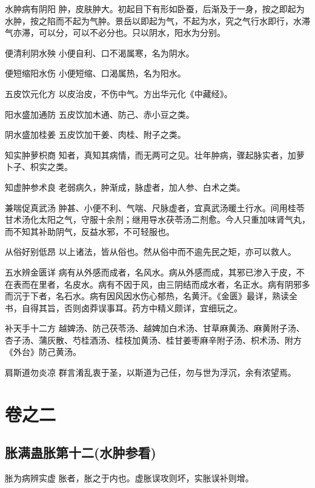 \documentclass[a4paper,12pt,UTF8,twoside]{ctexbook}
\begin{document}
    水肿病有阴阳
    肿，皮肤肿大。初起目下有形如卧蚕，后渐及于一身，按之即起为水肿，按之陷而不起为气肿。景岳以即起为气，不起为水，究之气行水即行，水滞气亦滞，可以分，可以不必分也。只以阴水，阳水为分别。
    
    便清利阴水殃
    小便自利、口不渴属寒，名为阴水。
    
    便短缩阳水伤
    小便短缩、口渴属热，名为阳水。
    
    五皮饮元化方
    以皮治皮，不伤中气。方出华元化《中藏经》。
    
    阳水盛加通防
    五皮饮加木通、防己、赤小豆之类。
    
    阴水盛加桂姜
    五皮饮加干姜、肉桂、附子之类。
    
    知实肿萝枳商
    知者，真知其病情，而无两可之见。壮年肿病，骤起脉实者，加萝卜子、枳实之类。
    
    知虚肿参术良
    老弱病久，肿渐成，脉虚者，加人参、白术之类。
    
    兼喘促真武汤
    肿甚、小便不利、气喘、尺脉虚者，宜真武汤暖土行水。间用桂苓甘术汤化太阳之气，守服十余剂；继用导水茯苓汤二剂愈。今人只重加味肾气丸，而不知其补助阴气，反益水邪，不可轻服也。
    
    从俗好别低昂
    以上诸法，皆从俗也。然从俗中而不逾先民之矩，亦可以救人。
    
    五水辨金匮详
    病有从外感而成者，名风水。病从外感而成，其邪已渗入于皮，不在表而在里者，名皮水。病有不因于风，由三阴结而成水者，名正水。病有阴邪多而沉于下者，名石水。病有因风因水伤心郁热，名黄汗。《金匮》最详，熟读全书，自得其旨，否则卤莽误事耳。药方中精义颇详，宜细玩之。
    
    补天手十二方
    越婢汤、防己茯苓汤、越婢加白术汤、甘草麻黄汤、麻黄附子汤、杏子汤、蒲灰散、芍桂酒汤、桂枝加黄汤、桂甘姜枣麻辛附子汤、枳术汤、附方《外台》防己黄汤。
    
    肩斯道勿炎凉
    群言淆乱衷于圣，以斯道为己任，勿与世为浮沉，余有浓望焉。
    
    
    
    \chapter{卷之二}
    \section{胀满蛊胀第十二(水肿参看)} 

    胀为病辨实虚
    胀者，胀之于内也。虚胀误攻则坏，实胀误补则增。
    
\end{document}
